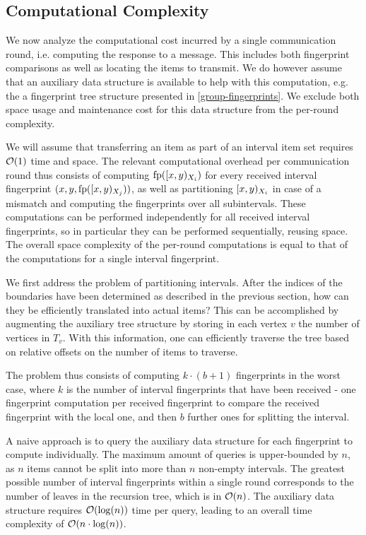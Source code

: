 \subsection{Computational Complexity}

We now analyze the computational cost incurred by a single communication round, i.e. computing the response to a message. This includes both fingerprint comparisons as well as locating the items to transmit. We do however assume that an auxiliary data structure is available to help with this computation, e.g. the a fingerprint tree structure presented in \cref{group-fingerprints}. We exclude both space usage and maintenance cost for this data structure from the per-round complexity.

We will assume that transferring an item as part of an interval item set requires $\mathcal{O}(1)$ time and space. The relevant computational overhead per communication round thus consists of computing $\operatorname{fp}([{x},{y})_{X_i})$ for every received interval fingerprint $({x}, {y}, {\operatorname{fp}([{x},{y})_{X_j})})$, as well as partitioning $[{x},{y})_{X_i}$ in case of a mismatch and computing the fingerprints over all subintervals. These computations can be performed independently for all received interval fingerprints, so in particular they can be performed sequentially, reusing space. The overall space complexity of the per-round computations is equal to that of the computations for a single interval fingerprint.

We first address the problem of partitioning intervals. After the indices of the boundaries have been determined as described in the previous section, how can they be efficiently translated into actual items? This can be accomplished by augmenting the auxiliary tree structure by storing in each vertex $v$ the number of vertices in $T_v$. With this information, one can efficiently traverse the tree based on relative offsets on the number of items to traverse.

The problem thus consists of computing $k \cdot (b + 1)$ fingerprints in the worst case, where $k$ is the number of interval fingerprints that have been received - one fingerprint computation per received fingerprint to compare the received fingerprint with the local one, and then $b$ further ones for splitting the interval.

A naive approach is to query the auxiliary data structure for each fingerprint to compute individually. The maximum amount of queries is upper-bounded by $n$, as $n$ items cannot be split into more than $n$ non-empty intervals. The greatest possible number of interval fingerprints within a single round corresponds to the number of leaves in the recursion tree, which is in $\mathcal{O}(n)$. The auxiliary data structure requires $\mathcal{O}(\log(n))$ time per query, leading to an overall time complexity of $\mathcal{O}(n \cdot \log(n))$.

